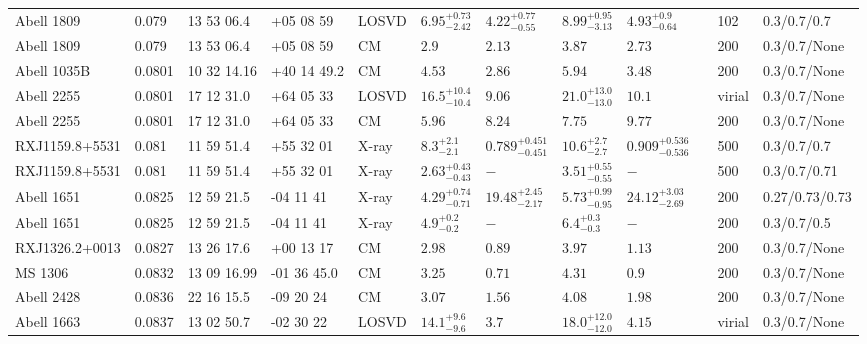 \begin{landscape}
\begin{center}
{\begin{longtable}{llllllllllll}
Abell 1809 & 0.079 & 13 53 06.4 & +05 08 59 & LOSVD & ${6.95}^{+0.73}_{-2.42}$ & ${4.22}^{+0.77}_{-0.55}$ & ${8.99}^{+0.95}_{-3.13}$ & ${4.93}^{+0.9}_{-0.64}$ & \citet{WO10.1} & 102 & 0.3/0.7/0.7 \\
Abell 1809 & 0.079 & 13 53 06.4 & +05 08 59 & CM & ${2.9}^{}_{}$ & ${2.13}^{}_{}$ & ${3.87}^{}_{}$ & ${2.73}^{}_{}$ & \citet{RI06.1} & 200 & 0.3/0.7/None \\
Abell 1035B & 0.0801 & 10 32 14.16 & +40 14 49.2 & CM & ${4.53}^{}_{}$ & ${2.86}^{}_{}$ & ${5.94}^{}_{}$ & ${3.48}^{}_{}$ & \citet{RI06.1} & 200 & 0.3/0.7/None \\
Abell 2255 & 0.0801 & 17 12 31.0 & +64 05 33 & LOSVD & ${16.5}^{+10.4}_{-10.4}$ & ${9.06}^{}_{}$ & ${21.0}^{+13.0}_{-13.0}$ & ${10.1}^{}_{}$ & \citet{AB11.1} & virial & 0.3/0.7/None \\
Abell 2255 & 0.0801 & 17 12 31.0 & +64 05 33 & CM & ${5.96}^{}_{}$ & ${8.24}^{}_{}$ & ${7.75}^{}_{}$ & ${9.77}^{}_{}$ & \citet{RI06.1} & 200 & 0.3/0.7/None \\
RXJ1159.8+5531 & 0.081 & 11 59 51.4 & +55 32 01 & X-ray & ${8.3}^{+2.1}_{-2.1}$ & ${0.789}^{+0.451}_{-0.451}$ & ${10.6}^{+2.7}_{-2.7}$ & ${0.909}^{+0.536}_{-0.536}$ & \citet{GA06.1} & 500 & 0.3/0.7/0.7 \\
RXJ1159.8+5531 & 0.081 & 11 59 51.4 & +55 32 01 & X-ray & ${2.63}^{+0.43}_{-0.43}$ & ${-}^{}_{}$ & ${3.51}^{+0.55}_{-0.55}$ & ${-}^{}_{}$ & \citet{VI06.1} & 500 & 0.3/0.7/0.71 \\
Abell 1651 & 0.0825 & 12 59 21.5 & -04 11 41 & X-ray & ${4.29}^{+0.74}_{-0.71}$ & ${19.48}^{+2.45}_{-2.17}$ & ${5.73}^{+0.99}_{-0.95}$ & ${24.12}^{+3.03}_{-2.69}$ & \citet{BA14.1} & 200 & 0.27/0.73/0.73 \\
Abell 1651 & 0.0825 & 12 59 21.5 & -04 11 41 & X-ray & ${4.9}^{+0.2}_{-0.2}$ & ${-}^{}_{}$ & ${6.4}^{+0.3}_{-0.3}$ & ${-}^{}_{}$ & \citet{XU01.1} & 200 & 0.3/0.7/0.5 \\
RXJ1326.2+0013 & 0.0827 & 13 26 17.6 & +00 13 17 & CM & ${2.98}^{}_{}$ & ${0.89}^{}_{}$ & ${3.97}^{}_{}$ & ${1.13}^{}_{}$ & \citet{RI06.1} & 200 & 0.3/0.7/None \\
MS 1306 & 0.0832 & 13 09 16.99 & -01 36 45.0 & CM & ${3.25}^{}_{}$ & ${0.71}^{}_{}$ & ${4.31}^{}_{}$ & ${0.9}^{}_{}$ & \citet{RI06.1} & 200 & 0.3/0.7/None \\
Abell 2428 & 0.0836 & 22 16 15.5 & -09 20 24 & CM & ${3.07}^{}_{}$ & ${1.56}^{}_{}$ & ${4.08}^{}_{}$ & ${1.98}^{}_{}$ & \citet{RI06.1} & 200 & 0.3/0.7/None \\
Abell 1663 & 0.0837 & 13 02 50.7 & -02 30 22 & LOSVD & ${14.1}^{+9.6}_{-9.6}$ & ${3.7}^{}_{}$ & ${18.0}^{+12.0}_{-12.0}$ & ${4.15}^{}_{}$ & \citet{AB11.1} & virial & 0.3/0.7/None \\

\end{longtable}}
\end{center}
\end{landscape}
